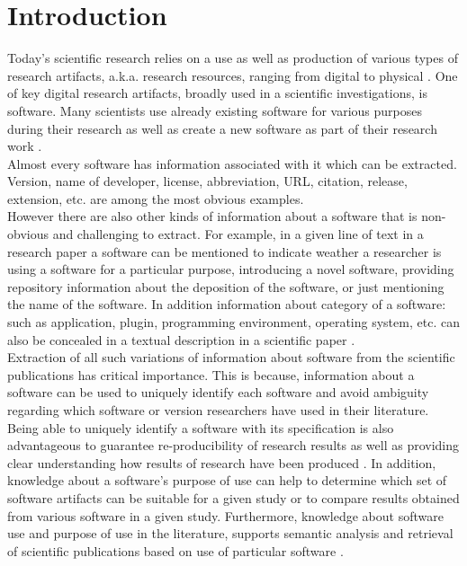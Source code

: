\chapter{Introduction}
\label{ch:intro}

Today’s scientific research relies on a use as well as production of various types of research artifacts, a.k.a. research resources, ranging from digital to physical \citep{schindler2019annotation}. One of key digital research artifacts, broadly used in a scientific investigations, is software. Many scientists use already existing software for various purposes during their research as well as create a new software as part of their research work \citep{goble2014better,hannay2009scientists}. \\

Almost every software has information associated with it which can be extracted. Version, name of developer, license, abbreviation, \ac{URL}, citation, release, extension, etc. are among the most obvious examples.  \\

However there are also other kinds of information about a software that is non-obvious and challenging to extract. For  example, in a given line of text in a research paper a software can be mentioned to indicate weather a researcher is using a software for a particular purpose, introducing a novel software, providing repository information about the deposition of the software, or just mentioning the name of the software. In addition information about category of a software: such as application, plugin, programming environment, operating system, etc.  can also be concealed in a textual description in a scientific paper \citep{schindler2021somesci}. \\

Extraction of all such variations of information about software from the scientific publications has critical importance. This is because, information about a software can be used to uniquely identify each software and avoid ambiguity regarding which software or version researchers have used in their literature. Being able to uniquely identify a software with its specification is also advantageous to guarantee re-producibility of research results as well as providing clear understanding how results of research have been produced \citep{kruger2019literature}. In addition, knowledge about a software’s purpose of use can help to determine which set of software artifacts can be suitable for a given study or to compare results obtained from various software in a given study. Furthermore, knowledge about software use and purpose of use in the literature, supports semantic analysis and retrieval of scientific publications based on use of particular software \citep{schindler2019annotation}.  \\


